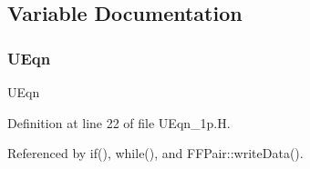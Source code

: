 \subsection{Variable Documentation}
\mbox{\label{UEqn__1p_8H_a7a16102cab1f7398d9732830aeb173bc}} 
\subsubsection{\texorpdfstring{U\+Eqn}{UEqn}}
{\footnotesize\ttfamily U\+Eqn}



Definition at line 22 of file U\+Eqn\+\_\+1p.\+H.



Referenced by if(), while(), and F\+F\+Pair\+::write\+Data().

